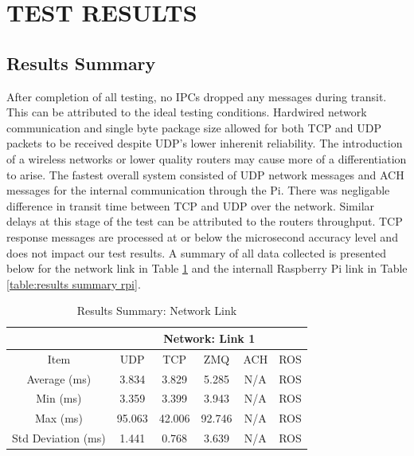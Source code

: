\section{TEST RESULTS}

\subsection{Results Summary}

After completion of all testing, no IPCs dropped any messages during transit. This can be attributed to the ideal testing conditions. Hardwired network communication and single byte package size allowed for both TCP and UDP packets to be received despite UDP's lower inherenit reliability. The introduction of a wireless networks or lower quality routers may cause more of a differentiation to arise. The fastest overall system consisted of UDP network messages and ACH messages for the internal communication through the Pi. There was negligable difference in transit time between TCP and UDP over the network. Similar delays at this stage of the test can be attributed to the routers throughput. TCP response messages are processed at or below the microsecond accuracy level and does not impact our test results. A summary of all data collected is presented below for the network link in Table \ref{table:results summary net} and the internall Raspberry Pi link in Table \ref{table:results summary rpi}.

\begin{table}[h]
\caption{Results Summary: Network Link}
\label{table:results summary net}
\begin{center}
\begin{tabular}{c|c||c||c||c||c|}
\cline{2-6}
& \multicolumn{5}{c|}{Network: Link 1}\\
\hline
\multicolumn{1}{|c|}{Item} & UDP & TCP & ZMQ &ACH & ROS\\
\hline
\multicolumn{1}{|c|}{Average (ms)} & 3.834 & 3.829 & 5.285 & N/A & ROS\\
\hline
\multicolumn{1}{|c|}{Min (ms)} & 3.359 & 3.399 & 3.943 & N/A & ROS\\
\hline
\multicolumn{1}{|c|}{Max (ms)} & 95.063 & 42.006 & 92.746 & N/A & ROS\\
\hline
\multicolumn{1}{|c|}{Std Deviation (ms)} & 1.441 & 0.768 & 3.639 & N/A & ROS\\
\hline
\end{tabular}
\end{center}
\end{table}

